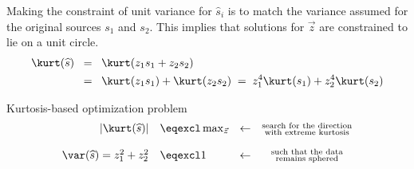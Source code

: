 \begin{frame}{\subsecname}


Making the constraint of unit variance for $\widehat{s}_i$ is to match the variance assumed for the original sources $s_1$ and $s_2$. This implies that solutions for $\vec z$ are constrained to lie on a unit circle.
\vspace{1mm}
\begin{align*}
\kurt(\widehat{s})  \;\; &= \;\; \kurt(z_1 s_1 + z_2 s_2) \;\; \\ &= \;\; \kurt(z_1 s_1) + \kurt(z_2 s_2) \; = \; z_1^4 \kurt(s_1) + z_2^4 \kurt(s_2)
\end{align*}

\begin{block}{Kurtosis-based optimization problem}
\begin{equation*}
	\begin{array}{rllc}
	\left| \kurt(\widehat{s}) \right| & \eqexcl \max_{\vec{z}} 
	& \leftarrow & \substack{ 	\text{search for the direction} \\
					\text{with extreme kurtosis}} \\\\
	\var(\widehat{s}) = z_1^2 + z_2^2 & \eqexcl 1
	& \leftarrow & \substack{	\text{such that the data} \\
					\text{remains sphered}}
	\end{array} 
\end{equation*}
  \end{block}
\end{frame}

